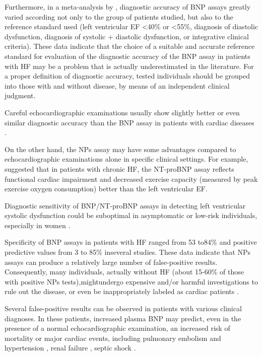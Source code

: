 \documentclass[14pt,a4paper,onecolumn]{extarticle}
\begin{document}
Furthermore, in a meta-analysis by \citep{bib372}, diagnostic accuracy of BNP assays greatly varied according not only to the group of patients studied, but also to the reference standard used (left ventricular EF <40\% or <55\%, diagnosis of diastolic dysfunction, diagnosis of systolic + diastolic dysfunction, or integrative clinical criteria). These data indicate that the choice of a suitable and accurate reference standard for evaluation of the diagnostic accuracy of the BNP assay in patients with HF may be a problem that is actually underestimated in the literature. For a proper definition of diagnostic accuracy, tested individuals should be grouped into those with and without disease, by means of an independent clinical judgment.

Careful echocardiographic examinations usually show slightly better or even similar diagnostic accuracy than the BNP assay in patients with cardiac diseases \citep{bib3178}.

On the other hand, the NPs assay may have some advantages compared to echocardiographic examinations alone in specific clinical settings. For example, \citep{bib375} suggested that in patients with chronic HF, the NT-proBNP assay reflects functional cardiac impairment and decreased exercise capacity (measured by peak exercise oxygen consumption) better than the left ventricular EF.

Diagnostic sensitivity of BNP/NT-proBNP assays in detecting left ventricular systolic dysfunction could be suboptimal in asymptomatic or low-risk individuals, especially in women \citep{bib39}.

Specificity of BNP assays in patients with HF ranged from 53 to84\% and positive predictive values from 3 to 85\% inseveral studies. These data indicate that NPs assays can produce a relatively large number of false-positive results. Consequently, many individuals, actually without HF (about 15-60\% of those with positive NPs tests),mightundergo expensive and/or harmful investigations to rule out the disease, or even be inappropriately labeled as cardiac patients \citep{bib35}.

Several false-positive results can be observed in patients with various clinical diagnoses. In these patients, increased plasma BNP may predict, even in the presence of a normal echocardiographic examination, an increased risk of mortality or major cardiac events, including pulmonary embolism \citep{121} \citep{123} \citep{bib382} and hypertension \citep{bib383}, renal failure \citep{bib384} \citep{bib385}, septic shock \citep{bib386}.
\end{document}
